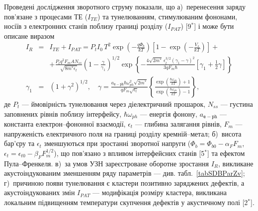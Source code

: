 Проведені дослідження зворотного струму показали, що
а)~перенесення заряду пов'язане з процесами ТЕ ($I_{TE}$) та тунелюванням, стимулюваним фононами, носіїв з електронних станів поблизу границі розділу ($I_{P\!AT}$)
[9$^*$]
і може бути описане виразом
\begin{eqnarray}
\label{eqIgen}
 I_R&=&I_{TE}+I_{P\!AT}=P_tI_0\,T^2\exp\left(-\frac{q\Phi_b}{kT}\right)\left[1-\exp\left(-\frac{V_s}{kT}\right)\right]+\\
 &&+\frac{P_tq^2F_mAN_{ss}}{\sqrt{8m^*\epsilon_t}}\left(1-\frac{\gamma}{\gamma_1}\right)^{1/2}\exp
    \left\{-\frac{4\sqrt{2m^*}\,\epsilon_t^{3/2}\left(\gamma_1-\gamma\right)^2}{3qF_m\hbar} \nonumber
    [\gamma_1+\frac{1}{2}\gamma]\right\}\\ \nonumber
    \gamma_1&=&(1+\gamma^2)^{1/2}, \quad
    \gamma=\frac{a_\mathtt{e-ph}\hbar\omega_{ph}^2\sqrt{2m^*}}{qF_m\sqrt{\epsilon_t}}
    \left\{\frac{\exp\left(\frac{\hbar\omega_{ph}}{kT}\right)+1}{\exp\left(\frac{\hbar\omega_{ph}}{kT}\right)-1}\right\},   \nonumber
\end{eqnarray}
де
$P_t$ --- ймовірність тунелювання через діелектричний прошарок,
$N_{ss}$ --- густина заповнених рівнів поблизу інтерфейсу,
$\hbar\omega_{ph}$ --- енергія фонону,
$a_\mathtt{e-ph}$ --- константа електрон--фононної взаємодії,
$\epsilon_t$ --- глибина залягання рівнів,
$F_m$ --- напруженість електричного поля на границі розділу кремній--метал;
б)~висота бар'єру та $\epsilon_t$ зменшуються при зростанні зворотної напруги
($\Phi_{b}=\Phi_{b0}-\alpha_{F} F_m$,
$\epsilon_t=\epsilon_{t0}-\beta_F F_m^{1/2}$), що пов'язано з впливом інтерфейсних станів
[5$^*$] та ефектом Пула--Френкеля.
в)~за умов УЗН зареєстроване оборотне зростання $I_R$, викликане акустоіндукованим зменшенням ряду параметрів --- див. табл.~\ref{tabSDBParZv};
г)~причиною появи тунелювання є кластери позитивно заряджених дефектів, а акустоіндукованих змін $I_{P\!AT}$ --- модифікація розміру кластера, викликана
локальним підвищенням температури скупчення дефектів у акустичному полі
[2$^*$].



